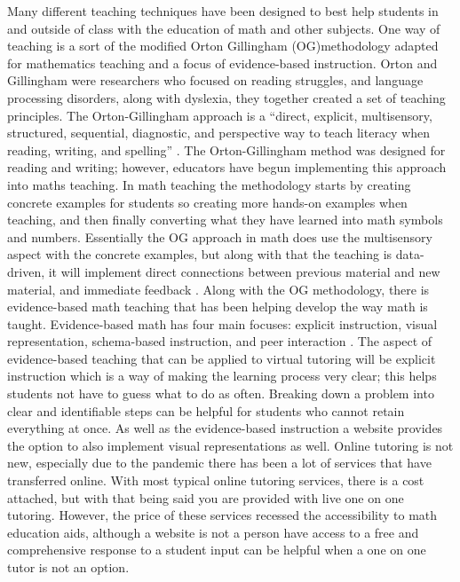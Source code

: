 \documentclass[10pt,twocolumn]{article}
\begin{document}
Many different teaching techniques have been designed to best help students in and outside of class with the education of math and other subjects. One way of teaching is a sort of the modified Orton Gillingham (OG)methodology adapted for mathematics teaching and a focus of evidence-based instruction. Orton and Gillingham were researchers who focused on reading struggles, and language processing disorders, along with dyslexia, they together created a set of teaching principles. The Orton-Gillingham approach is a “direct, explicit, multisensory, structured, sequential, diagnostic, and perspective way to teach literacy when reading, writing, and spelling” \cite{ahearn_what_2016}. The Orton-Gillingham method was designed for reading and writing; however, educators have begun implementing this approach into maths teaching. In math teaching the methodology starts by creating concrete examples for students so creating more hands-on examples when teaching, and then finally converting what they have learned into math symbols and numbers. Essentially the OG approach in math does use the multisensory aspect with the concrete examples, but along with that the teaching is data-driven, it will implement direct connections between previous material and new material, and immediate feedback \cite{noauthor_why_nodate}. Along with the OG methodology, there is evidence-based math teaching that has been helping develop the way math is taught. Evidence-based math has four main focuses: explicit instruction, visual representation, schema-based instruction, and peer interaction \cite{noauthor_evidence-based_nodate}. The aspect of evidence-based teaching that can be applied to virtual tutoring will be explicit instruction which is a way of making the learning process very clear; this helps students not have to guess what to do as often. Breaking down a problem into clear and identifiable steps can be helpful for students who cannot retain everything at once. As well as the evidence-based instruction a website provides the option to also implement visual representations as well. 
Online tutoring is not new, especially due to the pandemic there has been a lot of services that have transferred online. With most typical online tutoring services, there is a cost attached, but with that being said you are provided with live one on one tutoring. However, the price of these services recessed the accessibility to math education aids, although a website is not a person have access to a free and comprehensive response to a student input can be helpful when a one on one tutor is not an option. 
 
\end{document}
